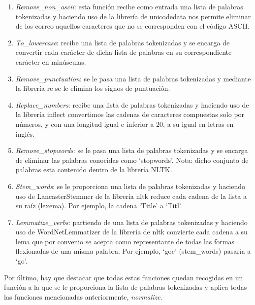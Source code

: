 \documentclass[conference,a4paper]{IEEEtran}
\begin{document}
\begin{enumerate}

\item \textit{Remove\_non\_ascii}: esta función recibe como entrada una lista de palabras tokenizadas y haciendo uso de la librería de unicodedata nos permite eliminar de los correo aquellos caracteres que no se corresponden con el código ASCII. 

\item \textit{To\_lowercase}: recibe una lista de palabras tokenizadas y se encarga de convertir cada carácter de dicha lista de palabras en su correspondiente carácter en minúsculas.

\item \textit{Remove\_punctuation}: se le pasa una lista de palabras tokenizadas y mediante la librería re se le elimina los signos de puntuación.

\item \textit{Replace\_numbers}: recibe una lista de palabras tokenizadas y haciendo uso de la librería inflect convertimos las cadenas de caracteres compuestas solo por números, y con una longitud igual e inferior a 20, a su igual en letras en inglés.

\item \textit{Remove\_stopwords}: se le pasa una lista de palabras tokenizadas y se encarga de eliminar las palabras conocidas como ‘stopwords’. Nota: dicho conjunto de palabras esta contenido dentro de la  librería NLTK. 

\item \textit{Stem\_words}: se le proporciona una lista de palabras tokenizadas y haciendo uso de LancasterStemmer de la librería nltk reduce cada cadena de la lista a su raíz (lexema). Por ejemplo, la cadena ‘Title’ a ‘Titl’.

\item \textit{Lemmatize\_verbs}: partiendo de una lista de palabras tokenizadas y haciendo uso de WordNetLemmatizer de la librería de nltk convierte cada cadena a su lema que por convenio se acepta como representante de todas las formas flexionadas de una misma palabra. Por ejemplo, ‘goe’ (stem\_words) pasaría a ‘go’.


\end{enumerate}


Por último, hay que destacar que todas estas funciones quedan recogidas en un función a la que se le proporciona la lista de palabras tokenizadas y aplica todas las funciones mencionadas anteriormente, \textit{normalize}. 
\end{document}
